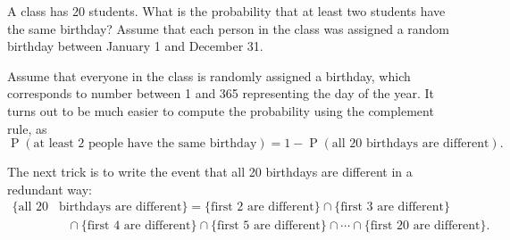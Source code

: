 \documentclass[11pt]{exam}
\DeclareMathOperator*{\Prob}{P}
\renewcommand{\Pr}{\Prob}
\begin{document}
\begin{questions}

\newpage

\question A class has 20 students.  What is the probability that at least
two students have the same birthday?  Assume that each person in the class was
assigned a random birthday between January 1 and December 31.

\begin{solution}
Assume that everyone in the class is randomly assigned a birthday, which
corresponds to number between 1 and 365 representing the day of the year.
It turns out to be much easier to compute the probability using the complement
rule, as
\[
  \Pr(\text{at least 2 people have the same birthday})
  = 1 - \Pr(\text{all 20 birthdays are different}).
\]


The next trick is to write the event that all 20 birthdays are different in a
redundant way:
\begin{align*}
\{\text{all 20} &\text{ birthdays are different}\}
  = \{ \text{first 2 are different} \}
  \cap \{ \text{first 3 are different} \} \\
  &\quad\cap \{ \text{first 4 are different} \}
  \cap \{ \text{first 5 are different} \}
  \cap \dotsb \cap \{ \text{first 20 are different} \}.
\end{align*}


\end{solution}
\end{questions}
\end{document}
